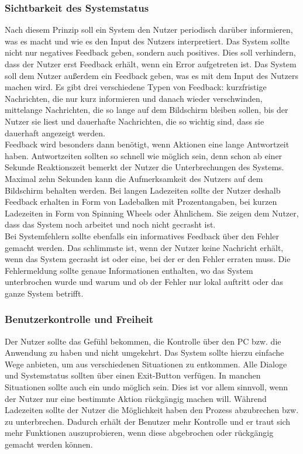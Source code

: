 \documentclass[utf8,biblatex]{lni}
\begin{document}
\subsubsection{Sichtbarkeit des Systemstatus}
Nach diesem Prinzip soll ein System den Nutzer periodisch darüber informieren, was es macht und wie es den Input des Nutzers interpretiert. Das System sollte nicht nur negatives Feedback geben, sondern auch positives. Dies soll verhindern, dass der Nutzer erst Feedback erhält, wenn ein Error aufgetreten ist. Das System soll dem Nutzer außerdem ein Feedback geben, was es mit dem Input des Nutzers machen wird. Es gibt drei verschiedene Typen von Feedback: kurzfristige Nachrichten, die nur kurz informieren und danach wieder verschwinden, mittelange Nachrichten, die so lange auf dem Bildschirm bleiben sollen, bis der Nutzer sie liest und dauerhafte Nachrichten, die so wichtig sind, dass sie dauerhaft angezeigt werden.\\
Feedback wird besonders dann benötigt, wenn Aktionen eine lange Antwortzeit haben. Antwortzeiten sollten so schnell wie möglich sein, denn schon ab einer Sekunde Reaktionszeit bemerkt der Nutzer die Unterbrechungen des Systems. Maximal zehn Sekunden kann die Aufmerksamkeit des Nutzers auf dem Bildschirm behalten werden. Bei langen Ladezeiten sollte der Nutzer deshalb Feedback erhalten in Form von Ladebalken mit Prozentangaben, bei kurzen Ladezeiten in Form von Spinning Wheels oder Ähnlichem. Sie zeigen dem Nutzer, dass das System noch arbeitet und noch nicht gecrasht ist.\\
Bei Systemfehlern sollte ebenfalls ein informatives Feedback über den Fehler gemacht werden. Das schlimmste ist, wenn der Nutzer keine Nachricht erhält, wenn das System gecrasht ist oder eine, bei der er den Fehler erraten muss. Die Fehlermeldung sollte genaue Informationen enthalten, wo das System unterbrochen wurde und warum und ob der Fehler nur lokal auftritt oder das ganze System betrifft.


\subsubsection{Benutzerkontrolle und Freiheit}
Der Nutzer sollte das Gefühl bekommen, die Kontrolle über den PC bzw. die Anwendung zu haben und nicht umgekehrt. Das System sollte hierzu einfache Wege anbieten, um aus verschiedenen Situationen zu entkommen. Alle Dialoge und Systemstatus sollten über einen Exit-Button verfügen. In manchen Situationen sollte auch ein undo möglich sein. Dies ist vor allem sinnvoll, wenn der Nutzer nur eine bestimmte Aktion rückgängig machen will. Während Ladezeiten sollte der Nutzer die Möglichkeit haben den Prozess abzubrechen bzw. zu unterbrechen. Dadurch erhält der Benutzer mehr Kontrolle und er traut sich mehr Funktionen auszuprobieren, wenn diese abgebrochen oder rückgängig gemacht werden können.
\end{document}
